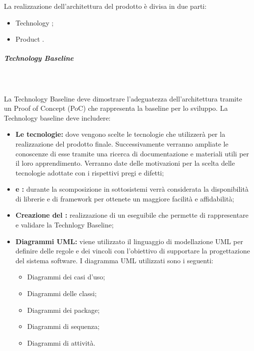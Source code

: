 La realizzazione dell’architettura del prodotto è divisa in due parti:
\begin{itemize}
	\item Technology ;
	\item Product .
\end{itemize}

\subparagraph{Technology Baseline}\mbox{}\\ \\
La Technology Baseline deve dimostrare l’adeguatezza dell’architettura tramite un Proof of Concept (PoC) che rappresenta la baseline per lo sviluppo. 
La Technology baseline deve includere:
\begin{itemize}
	\item \textbf{Le tecnologie:} dove vengono scelte le tecnologie che \Gruppo{} utilizzerà per la realizzazione del prodotto finale. Successivamente verranno ampliate le conoscenze di esse tramite una ricerca di documentazione e materiali utili per il loro apprendimento. Verranno date delle motivazioni per la scelta delle tecnologie adottate con i rispettivi pregi e difetti;
	\item \textbf{ e :} durante la scomposizione in sottosistemi verrà considerata la disponibilità di librerie e di framework per ottenete un maggiore facilità e affidabilità;
	\item \textbf{Creazione del :} realizzazione di un eseguibile che permette di rappresentare e validare la Technlogy Baseline;
	\item \textbf{Diagrammi UML:} viene utilizzato il linguaggio di modellazione UML per definire delle regole e dei vincoli con l'obiettivo di supportare la progettazione del sistema software. I diagramma UML utilizzati sono i seguenti:
	\begin{itemize}
		\item Diagrammi dei casi d'uso; 
		\item Diagrammi delle classi; 
		\item Diagrammi dei package;
		\item Diagrammi di sequenza; 
		\item Diagrammi di attività.
	\end{itemize}
\end{itemize}


